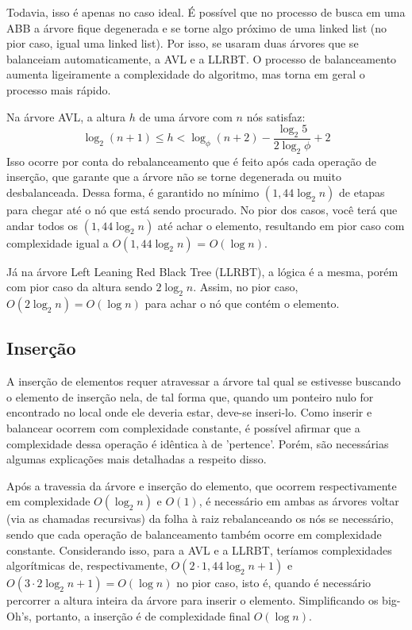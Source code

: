\documentclass{article}
\begin{document}
Todavia, isso é apenas no caso ideal. É possível que no processo de busca em uma ABB a árvore fique degenerada
e se torne algo próximo de uma linked list (no pior caso, igual uma linked list). Por isso, se usaram duas árvores 
que se balanceiam automaticamente, a AVL e a LLRBT. O processo de balanceamento aumenta ligeiramente a complexidade
do algoritmo, mas torna em geral o processo mais rápido.

Na árvore AVL, a altura $h$ de uma árvore com $n$ nós satisfaz:
$$\log_2(n+1) \leq h < \log_\phi(n+2) - \frac{\log_2 5}{2\log_2\phi} + 2$$
Isso ocorre por conta do rebalanceamento que é feito após cada operação de inserção, que garante que a árvore 
não se torne degenerada ou muito desbalanceada. Dessa forma, é garantido no mínimo $(1,44\log_2 n)$ de etapas para chegar até o nó
que está sendo procurado. No pior dos casos, você terá que andar todos os $(1,44\log_2 n)$ até achar o elemento, resultando em
pior caso com complexidade igual a $O(1,44 \log_2 n )$ = $O(\log n)$.
    
Já na árvore Left Leaning Red Black Tree (LLRBT), a lógica é a mesma, porém com pior caso da altura sendo $2\log_2 n$. Assim,
no pior caso, $O(2 \log_2 n ) = O(\log n)$ para achar o nó que contém o elemento.

\subsection{Inserção}
A inserção de elementos requer atravessar a árvore tal qual se estivesse buscando o elemento de inserção nela, de tal forma que,
quando um ponteiro nulo for encontrado no local onde ele deveria estar, deve-se inseri-lo. Como inserir e balancear ocorrem com
complexidade constante, é possível afirmar que a complexidade dessa operação é idêntica à de 'pertence'. Porém, são necessárias 
algumas explicações mais detalhadas a respeito disso.

Após a travessia da árvore e inserção do elemento, que ocorrem respectivamente 
em complexidade $O(\log_2 n)$ e $O(1)$, é necessário em ambas as árvores voltar (via as chamadas recursivas) da folha à raiz 
rebalanceando os nós se necessário, sendo que cada operação de balanceamento também ocorre em complexidade constante. Considerando 
isso, para a AVL e a LLRBT, teríamos complexidades algorítmicas de, respectivamente, $O(2 \cdot 1,44 \log_2 n + 1)$ e
 $O(3 \cdot 2 \log_2 n + 1) = O(\log n)$ no pior caso, isto é, quando é necessário percorrer a altura inteira da árvore para inserir 
 o elemento. Simplificando os big-Oh's, portanto, a inserção é de complexidade final $O(\log n)$.
\end{document}
